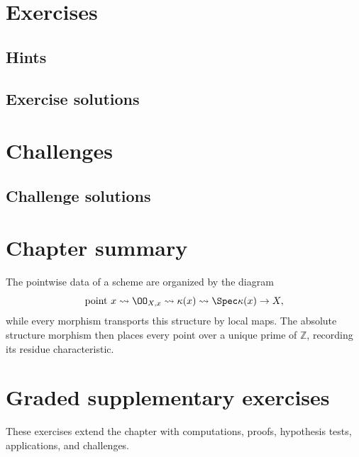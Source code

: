 \section{Exercises}

\ifdefined\IncludeExerciseHints
\subsection*{Hints}

\fi
\ifdefined\IncludeExerciseSolutions
\subsection*{Exercise solutions}

\fi

\section{Challenges}





\ifdefined\IncludeChallengeSolutions
\subsection*{Challenge solutions}

\fi

\section{Chapter summary}
The pointwise data of a scheme are organized by the diagram
\[
 \text{point }x
 \rightsquigarrow
 \OO_{X,x}
 \rightsquigarrow
 \kappa(x)
 \rightsquigarrow
 \Spec\kappa(x)\to X,
\]
while every morphism transports this structure by local maps.  The absolute structure morphism
then places every point over a unique prime of $\mathbb Z$, recording its residue characteristic.


\section{Graded supplementary exercises}
These exercises extend the chapter with computations, proofs, hypothesis tests, applications, and challenges.

